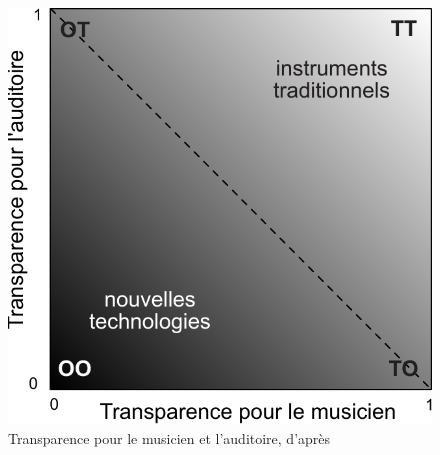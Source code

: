 \begin{figure}[!htbp]
	\captionsetup{format=plain}%
	\centering
	\begin{minipage}[t]{0.48\textwidth}
		\includegraphics[width=0.9\linewidth]{gfx/03_gesture/Fels-transparency.pdf}
		\caption[Transparence pour le musicien et l'auditoire (Fels)]{Transparence pour le musicien et l'auditoire, d'après \cite{fels_mapping_2002}}
		\label{fig:gesture:fels_transparency}
	\end{minipage}
	\hspace{.02\linewidth}
	\begin{minipage}[t]{0.48\textwidth}

\end{minipage}
\end{figure}
